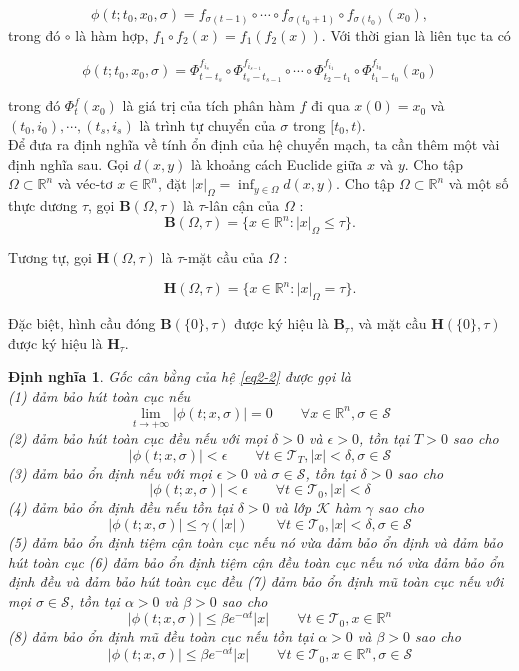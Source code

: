 \documentclass[14pt,a4paper,oneside]{report}		%
\newtheorem{define}[theorem]{Định nghĩa}
\begin{document}
\begin{equation} \label{eq2-4}
\phi (t;t_0,x_0,\sigma)=f_{\sigma (t-1)}\circ \cdots \circ f_{\sigma (t_0+1)}\circ f_{\sigma (t_0)}(x_0),
\end{equation}
trong đó $\circ$ là hàm hợp, $f_1 \circ f_2(x) = f_1(f_2(x))$. Với thời gian là liên tục ta có

\begin{equation} \label{eq2-5}
\phi (t;t_0,x_0,\sigma )=\Phi^{f_{i_s}}_{t-t_s}\circ\Phi^{f_{i_{s-1}}}_{t_s-t_{s-1}}\circ\cdots\circ\Phi^{f_{i_{1}}}_{t_2-t_{1}}\circ\Phi^{f_{i_{0}}}_{t_1-t_{0}}(x_0)
\end{equation}

trong đó $\Phi^f_t(x_0)$ là giá trị của tích phân hàm $f$ đi qua $x(0)=x_0$ và $(t_0,i_0),\cdots ,(t_s,i_s)$ là trình tự chuyển của $\sigma$ trong $[t_0,t)$.\\
Để đưa ra định nghĩa về tính ổn định của hệ chuyển mạch, ta cần thêm một vài định nghĩa sau. Gọi $d(x,y)$ là khoảng cách Euclide giữa $x$ và $y$. Cho tập $\Omega \subset\mathbb{R}^n$ và véc-tơ $x\in\mathbb{R}^n$, đặt $|x|_\Omega = \inf_{y\in\Omega}d(x,y)$. Cho tập $\Omega\subset\mathbb{R}^n$ và một số thực dương $\tau$, gọi $\mathbf{B}(\Omega , \tau)$ là $\tau$-lân cận của $\Omega$ :
$$\mathbf{B}(\Omega,\tau)=\{x\in\mathbb{R}^n:|x|_\Omega\leq\tau\}.$$

Tương tự, gọi $\mathbf{H}(\Omega,\tau)$ là $\tau$-mặt cầu của $\Omega$ :

$$\mathbf{H}(\Omega,\tau)=\{x\in\mathbb{R}^n:|x|_\Omega=\tau\}.$$

Đặc biệt, hình cầu đóng $\mathbf{B}(\{0\},\tau)$ được ký hiệu là $\mathbf{B}_\tau$, và mặt cầu $\mathbf{H}(\{0\},\tau)$ được ký hiệu là $\mathbf{H}_\tau$.

\begin{define} \label{def2-1}
Gốc cân bằng của hệ \ref{eq2-2} được gọi là\\
(1) đảm bảo hút toàn cục nếu
$$\lim_{t\rightarrow +\infty}|\phi (t;x,\sigma)|=0\qquad\forall x\in\mathbb{R}^n, \sigma\in\mathcal{S}$$
(2) đảm bảo hút toàn cục đều nếu với mọi $\delta >0$ và $\epsilon >0$, tồn tại $T>0$ sao cho
$$|\phi (t;x,\sigma)|<\epsilon\qquad\forall t\in\mathcal{T}_T, |x|<\delta,\sigma\in\mathcal{S}$$
(3) đảm bảo ổn định nếu với mọi $\epsilon > 0$ và $\sigma\in\mathcal{S}$, tồn tại $\delta >0$ sao cho
$$|\phi (t;x,\sigma)|<\epsilon\qquad\forall t\in\mathcal{T}_0, |x|<\delta$$
(4) đảm bảo ổn định đều nếu tồn tại $\delta > 0$ và lớp $\mathcal{K}$ hàm $\gamma$ sao cho
$$|\phi (t;x,\sigma)|\leq \gamma(|x|)\qquad\forall t\in\mathcal{T}_0, |x|<\delta,\sigma\in\mathcal{S}$$
(5) đảm bảo ổn định tiệm cận toàn cục nếu nó vừa đảm bảo ổn định và đảm bảo hút toàn cục
(6) đảm bảo ổn định tiệm cận đều toàn cục nếu nó vừa đảm bảo ổn định đều và đảm bảo hút toàn cục đều
(7) đảm bảo ổn định mũ toàn cục nếu với mọi $\sigma\in\mathcal{S}$, tồn tại $\alpha>0$ và $\beta >0$ sao cho
$$|\phi (t;x,\sigma)|\leq \beta e^{-\alpha t}|x|\qquad\forall t\in\mathcal{T}_0, x\in\mathbb{R}^n$$
(8) đảm bảo ổn định mũ đều toàn cục nếu tồn tại $\alpha>0$ và $\beta >0$ sao cho
$$|\phi (t;x,\sigma)|\leq \beta e^{-\alpha t}|x|\qquad\forall t\in\mathcal{T}_0, x\in\mathbb{R}^n, \sigma\in\mathcal{S}$$
\end{define}
\end{document}
